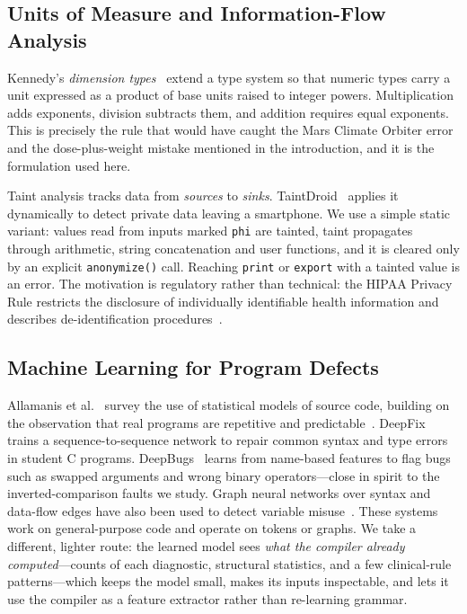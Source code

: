 \documentclass[conference]{IEEEtran}
\newcommand{\code}[1]{\texttt{#1}}
\begin{document}
\subsection{Units of Measure and Information-Flow Analysis}

Kennedy's \emph{dimension types}~\cite{kennedy1994} extend a type system so that numeric types carry a unit
expressed as a product of base units raised to integer powers. Multiplication adds exponents, division subtracts
them, and addition requires equal exponents. This is precisely the rule that would have caught the Mars Climate
Orbiter error and the dose-plus-weight mistake mentioned in the introduction, and it is the formulation used here.

Taint analysis tracks data from \emph{sources} to \emph{sinks}. TaintDroid~\cite{enck2010} applies it dynamically
to detect private data leaving a smartphone. We use a simple static variant: values read from inputs marked
\code{phi} are tainted, taint propagates through arithmetic, string concatenation and user functions, and it is
cleared only by an explicit \code{anonymize()} call. Reaching \code{print} or \code{export} with a tainted value is
an error. The motivation is regulatory rather than technical: the HIPAA Privacy Rule restricts the disclosure of
individually identifiable health information and describes de-identification procedures~\cite{hipaa}.

\subsection{Machine Learning for Program Defects}

Allamanis et al.~\cite{allamanis2018} survey the use of statistical models of source code, building on the
observation that real programs are repetitive and predictable~\cite{hindle2012}. DeepFix~\cite{gupta2017} trains a
sequence-to-sequence network to repair common syntax and type errors in student C programs. DeepBugs~\cite{pradel2018}
learns from name-based features to flag bugs such as swapped arguments and wrong binary operators---close in
spirit to the inverted-comparison faults we study. Graph neural networks over syntax and data-flow edges have
also been used to detect variable misuse~\cite{allamanis2018graphs}. These systems work on general-purpose code and
operate on tokens or graphs. We take a different, lighter route: the learned model sees \emph{what the compiler
already computed}---counts of each diagnostic, structural statistics, and a few clinical-rule patterns---which
keeps the model small, makes its inputs inspectable, and lets it use the compiler as a feature extractor rather than
re-learning grammar.
\end{document}
